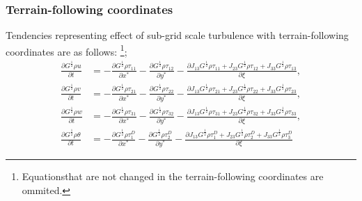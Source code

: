 \subsubsection{Terrain-following coordinates}
Tendencies representing effect of sub-grid scale turbulence with terrain-following coordinates are as follows:
\footnote{Equationsthat are not changed in the terrain-following coordinates are ommited.};
\begin{align}
  \frac{\partial G^{\frac{1}{2}}\rho u}{\partial t}
  &=
  - \frac{\partial G^{\frac{1}{2}}\rho\tau_{11}}{\partial x^*}
  - \frac{\partial G^{\frac{1}{2}}\rho\tau_{12}}{\partial y^*}
  - \frac{\partial J_{13}G^{\frac{1}{2}}\rho\tau_{11} + J_{23}G^{\frac{1}{2}}\rho\tau_{12} + J_{33}G^{\frac{1}{2}}\rho\tau_{13}}{\partial \xi}, \\
  \frac{\partial G^{\frac{1}{2}}\rho v}{\partial t}
  &=
  - \frac{\partial G^{\frac{1}{2}}\rho\tau_{21}}{\partial x^*}
  - \frac{\partial G^{\frac{1}{2}}\rho\tau_{22}}{\partial y^*}
  - \frac{\partial J_{13}G^{\frac{1}{2}}\rho\tau_{21} + J_{23}G^{\frac{1}{2}}\rho\tau_{22} + J_{33}G^{\frac{1}{2}}\rho\tau_{23}}{\partial \xi}, \\
  \frac{\partial G^{\frac{1}{2}}\rho w}{\partial t}
  &=
  - \frac{\partial G^{\frac{1}{2}}\rho\tau_{31}}{\partial x^*}
  - \frac{\partial G^{\frac{1}{2}}\rho\tau_{32}}{\partial y^*}
  - \frac{\partial J_{13}G^{\frac{1}{2}}\rho\tau_{31} + J_{23}G^{\frac{1}{2}}\rho\tau_{32} + J_{33}G^{\frac{1}{2}}\rho\tau_{33}}{\partial \xi}, \\
  \frac{\partial G^{\frac{1}{2}} \rho \theta}{\partial t}
  &=
  - \frac{\partial G^{\frac{1}{2}}\rho\tau^D_1}{\partial x^*}
  - \frac{\partial G^{\frac{1}{2}}\rho\tau^D_2}{\partial y^*}
  - \frac{\partial J_{13}G^{\frac{1}{2}}\rho\tau^D_1 + J_{23}G^{\frac{1}{2}}\rho\tau^D_2 + J_{33}G^{\frac{1}{2}}\rho\tau^D_3}{\partial \xi}
\end{align}
